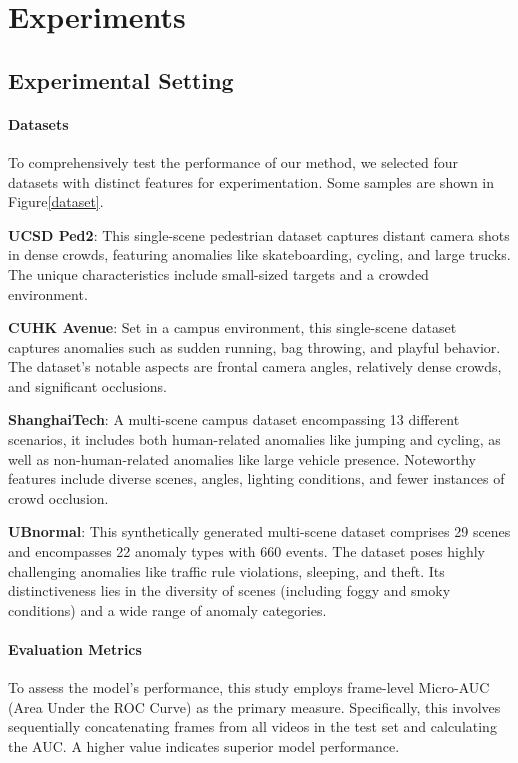 \documentclass[conference]{IEEEtran}
\begin{document}
\section{Experiments}


\subsection{Experimental Setting}
\paragraph{Datasets}
To comprehensively test the performance of our method, we selected four datasets with distinct features for experimentation. Some samples are shown in Figure\ref{dataset}.

\textbf{UCSD Ped2}\cite{ped2}: This single-scene pedestrian dataset captures distant camera shots in dense crowds, featuring anomalies like skateboarding, cycling, and large trucks. The unique characteristics include small-sized targets and a crowded environment.

\textbf{CUHK Avenue}\cite{avenue}: Set in a campus environment, this single-scene dataset captures anomalies such as sudden running, bag throwing, and playful behavior. The dataset's notable aspects are frontal camera angles, relatively dense crowds, and significant occlusions.

\textbf{ShanghaiTech}\cite{shanghaitech}: A multi-scene campus dataset encompassing 13 different scenarios, it includes both human-related anomalies like jumping and cycling, as well as non-human-related anomalies like large vehicle presence. Noteworthy features include diverse scenes, angles, lighting conditions, and fewer instances of crowd occlusion.

\textbf{UBnormal}\cite{ubnormal}: This synthetically generated multi-scene dataset comprises 29 scenes and encompasses 22 anomaly types with 660 events. The dataset poses highly challenging anomalies like traffic rule violations, sleeping, and theft. Its distinctiveness lies in the diversity of scenes (including foggy and smoky conditions) and a wide range of anomaly categories.

\paragraph{Evaluation Metrics}
To assess the model's performance, this study employs frame-level Micro-AUC\cite{georgescu2021background} (Area Under the ROC Curve) as the primary measure. Specifically, this involves sequentially concatenating frames from all videos in the test set and calculating the AUC. A higher value indicates superior model performance.
\end{document}
